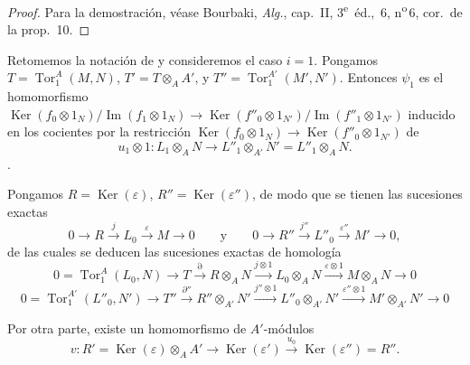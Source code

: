 \begin{proof}
Para la demostración, véase Bourbaki, \emph{Alg.}, cap.~II, 3\textsuperscript{e}~\'{e}d., \textsection\,6, n\textsuperscript{o}\,6, cor.\ de la prop.~10.
\end{proof}

\begin{env}[11.2.3]
\label{IV.11.2.3}
Retomemos la notación de  y consideremos el caso $i=1$.
Pongamos
$T=\operatorname{Tor}_1^A(M,N)$,
$T'=T\otimes_AA'$, y
$T''=\operatorname{Tor}_1^{A'}(M',N')$. Entonces $\psi_1$ es el homomorfismo
$\operatorname{Ker}(f_0\otimes1_N)/\operatorname{Im}(f_1\otimes1_N)
\to
\operatorname{Ker}(f''_0\otimes1_{N'})/
\operatorname{Im}(f''_1\otimes1_{N'})$
inducido en los cocientes por la restricción
$\operatorname{Ker}(f_0\otimes1_N)\to
\operatorname{Ker}(f''_0\otimes1_{N'})$
de
\[
u_1\otimes1:L_1\otimes_AN\to L''_1\otimes_{A'}N'=L''_1\otimes_AN.
\].

Pongamos $R=\operatorname{Ker}(\varepsilon)$, $R''=\operatorname{Ker}(\varepsilon'')$, de modo que se tienen las sucesiones exactas
\[
0\to R\xrightarrow{j}L_0\xrightarrow{\varepsilon}M\to0
\qquad\text{y}\qquad
0\to R''\xrightarrow{j''}L''_0\xrightarrow{\varepsilon''}M'\to0,
\]
de las cuales se deducen las sucesiones exactas de homología
\begin{equation}
0=\operatorname{Tor}_1^A(L_0,N)\to T\xrightarrow{\partial}R\otimes_AN
\xrightarrow{j\otimes1}L_0\otimes_AN\xrightarrow{\varepsilon\otimes1}
M\otimes_AN\to0
\label{IV.11.2.3.1-fr}
\tag{11.2.3.1}
\end{equation}
\begin{equation}
0=\operatorname{Tor}_1^{A'}(L''_0,N')\to T''\xrightarrow{\partial''}
R''\otimes_{A'}N'\xrightarrow{j''\otimes1}L''_0\otimes_{A'}N'
\xrightarrow{\varepsilon''\otimes1}M'\otimes_{A'}N'\to0
\label{IV.11.2.3.2-fr}
\tag{11.2.3.2}
\end{equation}

Por otra parte, existe un homomorfismo de $A'$-módulos
\[
v:R'=\operatorname{Ker}(\varepsilon)\otimes_AA'
\to\operatorname{Ker}(\varepsilon')\xrightarrow{u_0}
\operatorname{Ker}(\varepsilon'')=R''.
\]
\end{env}


